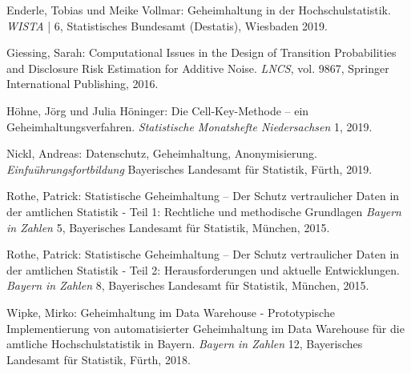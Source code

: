 

\begin{thebibliography}{9}
\singlespacing%

Enderle, Tobias und Meike Vollmar: Geheimhaltung in der Hochschulstatistik. \emph{WISTA} | 6, Statistisches Bundesamt (Destatis), Wiesbaden 2019.

Giessing, Sarah: Computational Issues in the Design of Transition Probabilities and Disclosure Risk Estimation for Additive Noise.
\emph{LNCS}, vol. 9867, Springer International Publishing, 2016.

Höhne, Jörg und Julia Höninger: Die Cell-Key-Methode – ein Geheimhaltungsverfahren. \emph{Statistische Monatshefte Niedersachsen} 1, 2019.

Nickl, Andreas: Datenschutz, Geheimhaltung, Anonymisierung. \emph{Einfuührungsfortbildung} Bayerisches Landesamt für Statistik, Fürth, 2019.

Rothe, Patrick: Statistische Geheimhaltung – Der Schutz vertraulicher Daten in der amtlichen Statistik - Teil 1: Rechtliche und methodische Grundlagen \emph{Bayern in Zahlen} 5, Bayerisches Landesamt für Statistik, München, 2015.

Rothe, Patrick: Statistische Geheimhaltung – Der Schutz vertraulicher Daten in der amtlichen Statistik - Teil 2: Herausforderungen und aktuelle Entwicklungen. \emph{Bayern in Zahlen} 8, Bayerisches Landesamt für Statistik, München, 2015.

Wipke, Mirko: Geheimhaltung im Data Warehouse - Prototypische Implementierung von automatisierter Geheimhaltung im Data Warehouse für die amtliche Hochschulstatistik in Bayern. \emph{Bayern in Zahlen} 12, Bayerisches Landesamt für Statistik, Fürth, 2018.





\end{thebibliography}%

\newpage%


